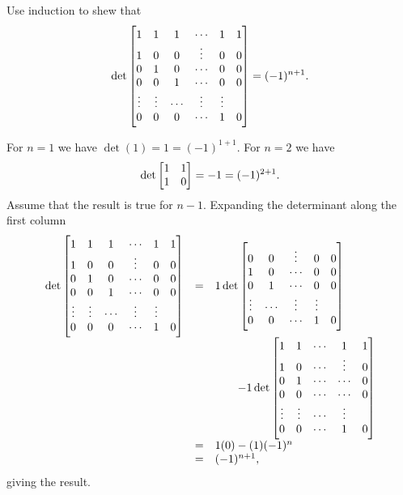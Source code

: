 \begin{pro}
Use induction to shew that
$$ \det\begin{bmatrix} 1 & 1 & 1 & \cdots & 1 &
1 \cr  1& 0 & 0 & \vdots & 0  & 0 \cr  0 & 1 & 0 & \cdots & 0  & 0
\cr 0 & 0 & 1& \cdots & 0  & 0 \cr \vdots & \vdots & \cdots &
\vdots & \vdots \cr 0 & 0 & 0 & \cdots& 1 & 0 \cr
\end{bmatrix} = (-1)^{n + 1}.$$
\label{exa:determinant_bunch_of_ones}\begin{answer} For $n = 1$ we
have $\det (1) = 1 = (-1)^{1 + 1}$. For $n = 2$ we have
$$\det \begin{bmatrix} 1 & 1 \cr 1 & 0 \cr
\end{bmatrix} = -1 = (-1)^{2 + 1}.
$$Assume that the result is true for $n -1$. Expanding the
determinant along the first column
$$ \begin{array}{lll}\det\begin{bmatrix} 1 & 1 & 1 & \cdots & 1 &
1 \cr  1& 0 & 0 & \vdots & 0  & 0 \cr  0 & 1 & 0 & \cdots & 0  & 0
\cr 0 & 0 & 1& \cdots & 0  & 0 \cr \vdots & \vdots & \cdots &
\vdots & \vdots \cr 0 & 0 & 0 & \cdots & 1 & 0 \cr
\end{bmatrix} &  = & 1\det\begin{bmatrix}  0 & 0 & \vdots & 0  & 0 \cr   1 & 0 & \cdots & 0  & 0
\cr  0 & 1& \cdots & 0  & 0 \cr  \vdots & \cdots & \vdots & \vdots
\cr  0 & 0 & \cdots & 1 & 0 \cr
\end{bmatrix} \\ & & \qquad - 1 \det\begin{bmatrix}  1 & 1 & \cdots & 1 &
1 \cr  1& 0 & \cdots & \vdots & 0   \cr  0 & 1 & \cdots & \cdots &
0 \cr 0 & 0 & \cdots & \cdots & 0   \cr \vdots & \vdots & \cdots &
\vdots \cr 0 & 0 & \cdots & 1 & 0 \cr
\end{bmatrix}\\
& = & 1(0) - (1)(-1)^{n}\\
& = &  (-1)^{n + 1},\\ \end{array}$$giving the result.
\end{answer}
\end{pro}
